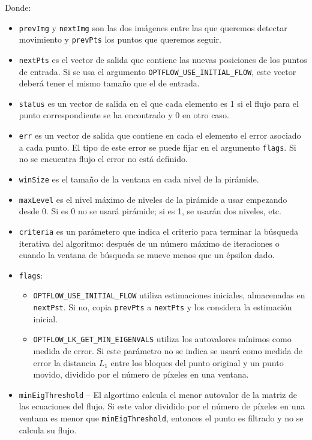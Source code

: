 \documentclass[a4paper,openright, 12pt]{book}
\begin{document}
Donde:
\begin{itemize}
\item \lstinline|prevImg| y \lstinline|nextImg| son las dos imágenes entre las que queremos detectar movimiento y \lstinline|prevPts| los puntos que queremos seguir.
\item \lstinline|nextPts| es el vector de salida que contiene las nuevas posiciones de los puntos de entrada. Si se usa el argumento \lstinline|OPTFLOW_USE_INITIAL_FLOW|, este vector deberá tener el mismo tamaño que el de entrada.

\item \lstinline|status| es un vector de salida en el que cada elemento es 1 si el flujo para el punto correspondiente se ha encontrado y 0 en otro caso.

\item \lstinline|err| es un vector de salida que contiene en cada el elemento el error asociado a cada punto. El tipo de este error se puede fijar en el argumento \lstinline|flags|.  Si no se encuentra flujo el error no está definido.

\item \lstinline|winSize| es el tamaño de la ventana en cada nivel de la pirámide.


\item \lstinline|maxLevel| es el nivel máximo de niveles  de la pirámide a usar empezando desde 0. Si es 0 no se usará pirámide; si es 1, se usarán dos niveles, etc. 

\item \lstinline|criteria| es un parámetero que indica el criterio para terminar la búsqueda iterativa del algoritmo: después de un número máximo de iteraciones
o cuando la ventana de búsqueda se mueve menos que un épsilon dado.
\newpage
\item \lstinline|flags|:
	\begin{itemize}
    \item \lstinline|OPTFLOW_USE_INITIAL_FLOW| utiliza estimaciones iniciales, almacenadas en \lstinline|nextPst|. Si no, copia \lstinline|prevPts| a \lstinline|nextPts| y los considera la estimación inicial.
    
    \item \lstinline|OPTFLOW_LK_GET_MIN_EIGENVALS| utiliza los autovalores mínimos como medida de error. Si este parámetro no se indica se usará como medida de error la distancia $L_1$ entre los bloques del punto original y un punto movido, dividido por el número de píxeles en una ventana.
	\end{itemize}
\item \lstinline|minEigThreshold| –  El algortimo calcula el menor autovalor de la matriz de las ecuaciones del flujo. Si este valor dividido por el número de píxeles en una ventana es menor que \lstinline|minEigThreshold|, entonces el punto es filtrado y no se calcula su flujo.

\end{itemize}
\newpage
\end{document}
